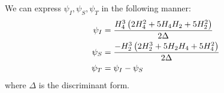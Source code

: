 \begin{boxproposition}\label{Ch4:Def:psis}
    We can express $\psi_I, \psi_S, \psi_T$ in the following manner:
    \begin{align}
        \psi_I &= \frac{H_4^3\left( 2 H_4^2 + 5 H_4 H_2 + 5 H_2^2 \right)}{2 \Delta}
            \label{Ch4:Eq:psi_I_def} \\
        \psi_S &= \frac{- H_2^3 \left( 2 H_2^3 + 5 H_2 H_4 + 5 H_4^2 \right)}{2 \Delta}
            \label{Ch4:Eq:psi_S_def} \\
        \psi_T &= \psi_I - \psi_S
            \label{Ch4:Eq:psi_T_def}
    \end{align}
    where $\Delta$ is the discriminant form.
\end{boxproposition}